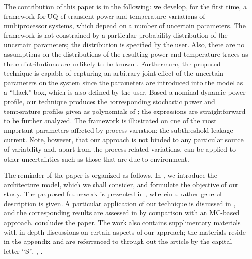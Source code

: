 The contribution of this paper is in the following: we develop, for the first time, a framework for UQ of transient power and temperature variations of multiprocessor systems, which depend on a number of uncertain parameters. The framework is not constrained by a particular probability distribution of the uncertain parameters; the distribution is specified by the user. Also, there are no assumptions on the distributions of the resulting power and temperature traces as these distributions are unlikely to be known \apriori. Furthermore, the proposed technique is capable of capturing an arbitrary joint effect of the uncertain parameters on the system since the parameters are introduced into the model as a ``black'' box, which is also defined by the user. Based a nominal dynamic power profile, our technique produces the corresponding stochastic power and temperature profiles given as polynomials of \rvs; the expressions are straightforward to be further analyzed. The framework is illustrated on one of the most important parameters affected by process variation: the subthreshold leakage current. Note, however, that our approach is not binded to any particular source of variability and, apart from the process-related variations, can be applied to other uncertainties such as those that are due to environment.

The reminder of the paper is organized as follows. In , we introduce the architecture model, which we shall consider, and formulate the objective of our study. The proposed framework is presented in , wherein a rather general description is given. A particular application of our technique is discussed in , and the corresponding results are assessed in  by comparison with an MC-based approach.  concludes the paper. The work also contains supplimentary materials with in-depth discussions on certain aspects of our approach; the materials reside in the appendix and are referrenced to through out the article by the capital letter ``S'', \eg, .
